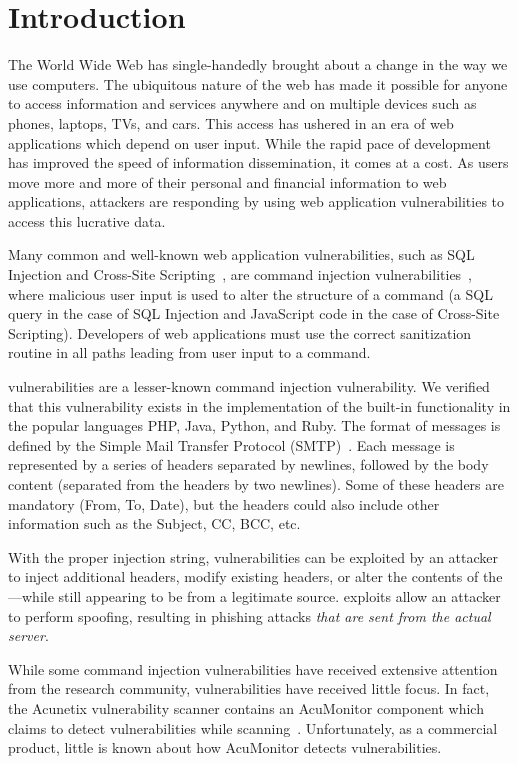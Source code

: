\section{Introduction}
The World Wide Web has single-handedly brought about a change in the way we use computers. The ubiquitous nature of the web has made it possible for anyone to access information and services anywhere and on multiple devices such as phones, laptops, TVs, and cars. This access has ushered in an era of web applications which depend on user input. 
While the rapid pace of development has improved the speed of information dissemination, it comes at a cost. As users move more and more of their personal and financial information to web applications, attackers are responding by using web application vulnerabilities to access this lucrative data.

Many common and well-known web application vulnerabilities, such as SQL Injection and Cross-Site Scripting~\cite{OWASPT10}, are command injection vulnerabilities~\cite{commandinjection}, where malicious user input is used to alter the structure of a command (a SQL query in the case of SQL Injection and JavaScript code in the case of Cross-Site Scripting). Developers of web applications must use the correct sanitization routine in all paths leading from user input to a command. 

\ehi vulnerabilities are a lesser-known command injection vulnerability. We verified that this vulnerability exists in the implementation of the built-in \email functionality in the popular languages PHP, Java, Python, and Ruby. The format of \email messages is defined by the Simple Mail Transfer Protocol (SMTP)~\cite{rfc5322}. Each \email message is represented by a series of headers separated by newlines, followed by the body content (separated from the headers by two newlines). Some of these headers are mandatory (From, To, Date), but the headers could also include other information such as the Subject, CC, BCC, etc.

With the proper injection string, \ehi vulnerabilities can be exploited by an attacker to inject additional headers, modify existing headers, or alter the contents of the \email---while still appearing to be from a legitimate source. \ehi exploits allow an attacker to perform \email spoofing, resulting in phishing attacks \emph{that are sent from the actual \email server}.

While some command injection vulnerabilities have received extensive attention from the research community, \ehi vulnerabilities have received little focus. In fact, the Acunetix vulnerability scanner contains an AcuMonitor component which claims to detect \ehi vulnerabilities while scanning~\cite{acumonitor}. Unfortunately, as a commercial product, little is known about how AcuMonitor detects \ehi vulnerabilities. 

